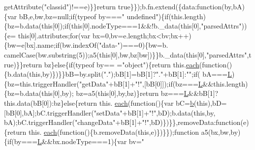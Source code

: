 \begin{DoxyCode}
      getAttribute(\textcolor{stringliteral}{"classid"})!==e)\}\}\textcolor{keywordflow}{return} \textcolor{keyword}{true}\}\});b.fn.extend(\{data:\textcolor{keyword}{function}(by,bA)\{var bB,e,bw,bz=null;\textcolor{keywordflow}{if}(typeof by===\textcolor{stringliteral}{"
      undefined"})\{\textcolor{keywordflow}{if}(this.length)\{bz=b.data(\textcolor{keyword}{this}[0]);\textcolor{keywordflow}{if}(\textcolor{keyword}{this}[0].nodeType===1&&!b.\_data(\textcolor{keyword}{this}[0],\textcolor{stringliteral}{"parsedAttrs"}))\{e=\textcolor{keyword}{
      this}[0].attributes;\textcolor{keywordflow}{for}(var bx=0,bv=e.length;bx<bv;bx++)\{bw=e[bx].name;\textcolor{keywordflow}{if}(bw.indexOf(\textcolor{stringliteral}{"data-"})===0)\{bw=b.
      camelCase(bw.substring(5));a5(\textcolor{keyword}{this}[0],bw,bz[bw])\}\}b.\_data(\textcolor{keyword}{this}[0],\textcolor{stringliteral}{"parsedAttrs"},\textcolor{keyword}{true})\}\}\textcolor{keywordflow}{return} bz\}\textcolor{keywordflow}{else}\{\textcolor{keywordflow}{if}(typeof by==
      =\textcolor{stringliteral}{"object"})\{\textcolor{keywordflow}{return} this.\hyperlink{jquery_8js_a871ff39db627c54c710a3e9909b8234c}{each}(\textcolor{keyword}{function}()\{b.data(\textcolor{keyword}{this},by)\})\}\}bB=by.split(\textcolor{stringliteral}{"."});bB[1]=bB[1]?\textcolor{stringliteral}{"."}+bB[1]:\textcolor{stringliteral}{""};\textcolor{keywordflow}{if}(
      bA===\hyperlink{jquery_8js_a38ee4c0b5f4fe2a18d0c783af540d253}{L})\{bz=this.triggerHandler(\textcolor{stringliteral}{"getData"}+bB[1]+\textcolor{stringliteral}{"!"},[bB[0]]);\textcolor{keywordflow}{if}(bz===\hyperlink{jquery_8js_a38ee4c0b5f4fe2a18d0c783af540d253}{L}&&this.length)\{bz=b.data(\textcolor{keyword}{this}[0],by);
      bz=a5(\textcolor{keyword}{this}[0],by,bz)\}\textcolor{keywordflow}{return} bz===\hyperlink{jquery_8js_a38ee4c0b5f4fe2a18d0c783af540d253}{L}&&bB[1]?this.data(bB[0]):bz\}\textcolor{keywordflow}{else}\{\textcolor{keywordflow}{return} this.
      \hyperlink{jquery_8js_a871ff39db627c54c710a3e9909b8234c}{each}(\textcolor{keyword}{function}()\{var bC=\hyperlink{jquery_8js_aa4026ad5544b958e54ce5e106fa1c805}{b}(\textcolor{keyword}{this}),bD=[bB[0],bA];bC.triggerHandler(\textcolor{stringliteral}{"setData"}+bB[1]+\textcolor{stringliteral}{"!"},bD);b.data(\textcolor{keyword}{this},by,
      bA);bC.triggerHandler(\textcolor{stringliteral}{"changeData"}+bB[1]+\textcolor{stringliteral}{"!"},bD)\})\}\},removeData:\textcolor{keyword}{function}(e)\{\textcolor{keywordflow}{return} this.
      \hyperlink{jquery_8js_a871ff39db627c54c710a3e9909b8234c}{each}(\textcolor{keyword}{function}()\{b.removeData(\textcolor{keyword}{this},e)\})\}\});\textcolor{keyword}{function} a5(bx,bw,by)\{\textcolor{keywordflow}{if}(by===\hyperlink{jquery_8js_a38ee4c0b5f4fe2a18d0c783af540d253}{L}&&bx.nodeType===1)\{var bv=\textcolor{stringliteral}{"
}
\end{DoxyCode}
